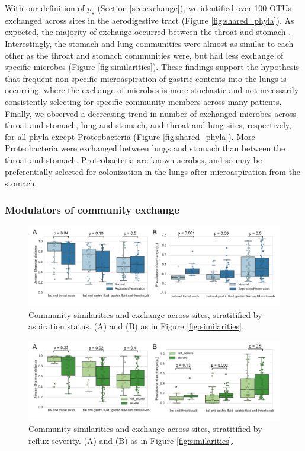 \documentclass[12pt]{article}
\begin{document}
With our definition of $p_s$ (Section \ref{sec:exchange}), we identified over 100
OTUs exchanged across sites in the aerodigestive tract (Figure \ref{fig:shared_phyla}).
As expected, the majority of exchange occurred between the throat and stomach \cite{bassis-source-2015}.
Interestingly, the stomach and lung communities were almost as similar to
each other as the throat and stomach communities were,
but had less exchange of specific microbes (Figure \ref{fig:similarities}). 
These findings support the hypothesis that frequent non-specific microaspiration
of gastric contents into the lungs is occurring,
where the exchange of microbes is more stochastic and
not necessarily consistently selecting for specific community members across many patients.
Finally, we observed a decreasing trend in number of exchanged microbes 
across throat and stomach, lung and stomach, and throat and lung sites, respectively, 
for all phyla except Proteobacteria (Figure \ref{fig:shared_phyla}). More Proteobacteria were exchanged 
between lungs and stomach than between the throat and stomach. Proteobacteria are 
known aerobes, and so may be preferentially selected for colonization in 
the lungs after microaspiration from the stomach.

\subsubsection{Modulators of community exchange}
\begin{figure}
\begin{center}
	\includegraphics[scale=0.7]{aspiration}
	\caption{Community similarities and exchange across sites, stratitified by aspiration status.
	(A) and (B) as in Figure \ref{fig:similarities}.}
	\label{fig:aspirators}
\end{center}
\end{figure}

\begin{figure}
\begin{center}
	\includegraphics[scale=0.7]{reflux}
	\caption{Community similarities and exchange across sites, stratitified by reflux severity.
	(A) and (B) as in Figure \ref{fig:similarities}.}
	\label{fig:reflux}
\end{center}
\end{figure}
\end{document}
